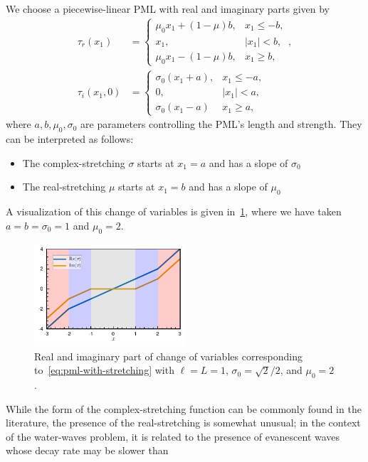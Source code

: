 \documentclass[11pt]{article}
\begin{document}
We choose a piecewise-linear PML with real and imaginary
parts given by
\begin{align}
\label{eq:pml-with-stretching}  
  \tau_r(x_1) &= \begin{cases}
      \mu_0 x_1 + (1-\mu)b, & x_1 \leq -b,\\  
      x_1, & |x_1| < b, \\
      \mu_0 x_1 - (1-\mu)b, & x_1 \geq b, 
  \end{cases}, \\
  \tau_i(x_1,0) &= \begin{cases}
      \sigma_0 (x_1+a), & x_1 \leq -a, \\
      0, & |x_1| < a, \\
      \sigma_0 (x_1 - a) & x_1 \geq a,
  \end{cases}
\end{align}
where $a,b,\mu_0, \sigma_0$ are parameters controlling the PML's length and
strength. They can be interpreted as follows:
\begin{itemize}
  \item The complex-stretching $\sigma$ starts at $x_1 = a$ and has a slope of
  $\sigma_0$
  \item The real-stretching $\mu$ starts at $x_1 = b$ and has a slope of $\mu_0$
\end{itemize}
A visualization of this change of variables is given
in~\cref{fig:pml-with-stretching}, where we have taken $a=b=\sigma_0=1$ and
$\mu_0 = 2$.
\begin{figure}
  \centering
  \includegraphics[width=0.5\textwidth]{figures/pml_real_and_imag.pdf}
  \caption{Real and imaginary part of change of variables corresponding
  to~\cref{eq:pml-with-stretching} with $\ell = L = 1$, $\sigma_0 = \sqrt{2}/2$,
  and $\mu_0 = 2$.}
  \label{fig:pml-with-stretching}
\end{figure}

While the form of the complex-stretching function can be commonly found in the
literature, the presence of the real-stretching is somewhat unusual; in the
context of the water-waves problem, it is related to the presence of evanescent
waves whose decay rate may be slower than  
\end{document}
